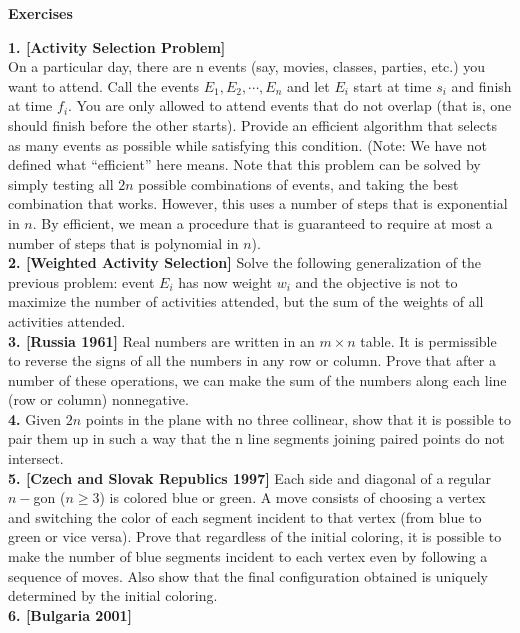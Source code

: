 \documentclass[a4paper,11pt]{book}
\begin{document}
\begin{center}
\begin{large}
\textbf{ Exercises}
\end{large}
\end{center}
\textbf{ 1. [Activity Selection Problem]}\\
On a particular day, there are n events (say, movies, classes,
parties, etc.) you want to attend. Call the events $ E_1, E_2, \cdots, E_n$
and let $E_i$ start at time $s_i$ and finish at time $f_i$. You are only
allowed to attend events that do not overlap (that is, one
should finish before the other starts). Provide an efficient
algorithm that selects as many events as possible while satisfying this condition.
(Note: We have not defined what “efficient” here means. Note
that this problem can be solved by simply testing all $2n$
possible combinations of events, and taking the best
combination that works. However, this uses a number of steps
that is exponential in $n$. By efficient, we mean a procedure that
is guaranteed to require at most a number of steps that is
polynomial in $n$).\\
\textbf{ 2. [Weighted Activity Selection]}
Solve the following generalization of the previous problem:
event $E_i$ has now weight $w_i$ and the objective is not to
maximize the number of activities attended, but the sum of the
weights of all activities attended.\\
\textbf{3. [Russia 1961]}
Real numbers are written in an $m \times n$ table. It is permissible to
reverse the signs of all the numbers in any row or column.
Prove that after a number of these operations, we can make
the sum of the numbers along each line (row or column)
nonnegative.\\
\textbf{ 4.} Given $2n$ points in the plane with no three collinear, show that
it is possible to pair them up in such a way that the n line
segments joining paired points do not intersect.\\
\textbf{ 5. [Czech and Slovak Republics 1997]}
Each side and diagonal of a regular $n-$gon ($n ≥ 3$) is colored
blue or green. A move consists of choosing a vertex and
switching the color of each segment incident to that vertex
(from blue to green or vice versa). Prove that regardless of the
initial coloring, it is possible to make the number of blue
segments incident to each vertex even by following a sequence
of moves. Also show that the final configuration obtained is
uniquely determined by the initial coloring.\\
\textbf{ 6. [Bulgaria 2001]}
\end{document}

